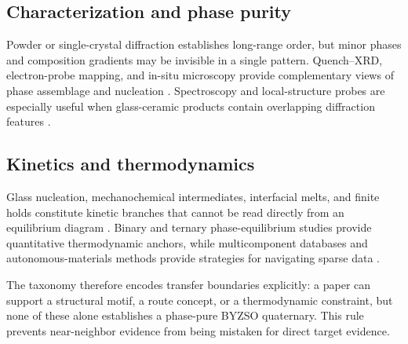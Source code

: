 \subsection{Characterization and phase purity}

Powder or single-crystal diffraction establishes long-range order, but minor phases and composition gradients may be invisible in a single pattern. Quench--XRD, electron-probe mapping, and in-situ microscopy provide complementary views of phase assemblage and nucleation \cite{kim2025key,derensy2026phase,martinson2019pellet,abdeyazdan2024phase,mckenzie2021nucleation,bocker2012in}. Spectroscopy and local-structure probes are especially useful when glass-ceramic products contain overlapping diffraction features \cite{mastelaro2018x,abdelhameed2023structural,srabionyan2024local,shaaban2021spectroscopic}.

\subsection{Kinetics and thermodynamics}

Glass nucleation, mechanochemical intermediates, interfacial melts, and finite holds constitute kinetic branches that cannot be read directly from an equilibrium diagram \cite{moulton2021a,rana2021insights,schmelzer2020effects,zhang2026interfacial,jang2025identification}. Binary and ternary phase-equilibrium studies provide quantitative thermodynamic anchors, while multicomponent databases and autonomous-materials methods provide strategies for navigating sparse data \cite{shevchenko2021integrated,jeon2025phase,kim2025key,chen2024navigating,szymanski2023an}.

The taxonomy therefore encodes transfer boundaries explicitly: a paper can support a structural motif, a route concept, or a thermodynamic constraint, but none of these alone establishes a phase-pure BYZSO quaternary. This rule prevents near-neighbor evidence from being mistaken for direct target evidence.
